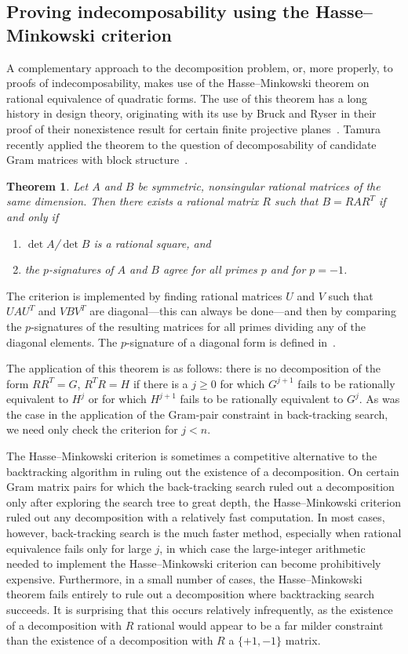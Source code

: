 \documentclass[11pt,a4paper]{article}
\newtheorem{theorem}{Theorem}
\begin{document}
\subsection{Proving indecomposability using the Hasse--Minkowski criterion}
A complementary approach to the decomposition problem, or, more properly, to proofs of indecomposability, makes use of the Hasse--Minkowski theorem on rational equivalence of quadratic forms.  The use of this theorem has a long history in design theory, originating with its use by Bruck and Ryser in their proof of their nonexistence result for certain finite projective planes~\cite{BrRy49}.  Tamura recently applied the theorem to the question of decomposability of candidate Gram matrices with block structure~\cite{Tamura06}.
\begin{theorem}
Let $A$ and $B$ be symmetric, nonsingular rational matrices of the same dimension.  Then there exists a rational matrix $R$ such that $B=RAR^T$ if and only if
\begin{enumerate}
\item $\det A$/$\det B$ is a rational square, and
\item the $p$-signatures  of $A$ and $B$ agree for all primes $p$ and for $p=-1$.
\end{enumerate}
\end{theorem}
The criterion is implemented by finding rational matrices $U$ and $V$ such that $UAU^T$ and $VBV^T$ are diagonal---this can always be done---and then by comparing the $p$-signatures of the resulting matrices for all primes dividing any of the diagonal elements.  The $p$-signature of a diagonal form is defined in~\cite[Chapter 15, \S5.1]{ConSlo98}.

The application of this theorem is as follows: there is no decomposition of the form $RR^T=G$, $R^TR=H$ if there is a $j\ge0$ for which $G^{j+1}$ fails to be rationally equivalent to $H^j$ or for which $H^{j+1}$ fails to be rationally equivalent to $G^j$.  As was the case in the application of the Gram-pair constraint in back-tracking search, we need only check the criterion for $j<n$.  

The Hasse--Minkowski criterion is sometimes a competitive alternative to the backtracking algorithm in ruling out the existence of a decomposition.  On certain Gram matrix pairs for which the back-tracking search ruled out a decomposition only after exploring the search tree to great depth, the Hasse--Minkowski criterion ruled out any decomposition with a relatively fast computation.  In most cases, however, back-tracking search is the much faster method, especially when rational equivalence fails only for large $j$, in which case the large-integer arithmetic needed to implement the Hasse--Minkowski criterion can become prohibitively expensive.  Furthermore, in a small number of cases, the Hasse--Minkowski theorem fails entirely to rule out a decomposition where backtracking search succeeds.  It is surprising that this occurs relatively infrequently, as the existence of a decomposition with $R$ rational would appear to be a far milder constraint than the existence of a decomposition with $R$ a $\{+1,-1\}$ matrix.
\end{document}
